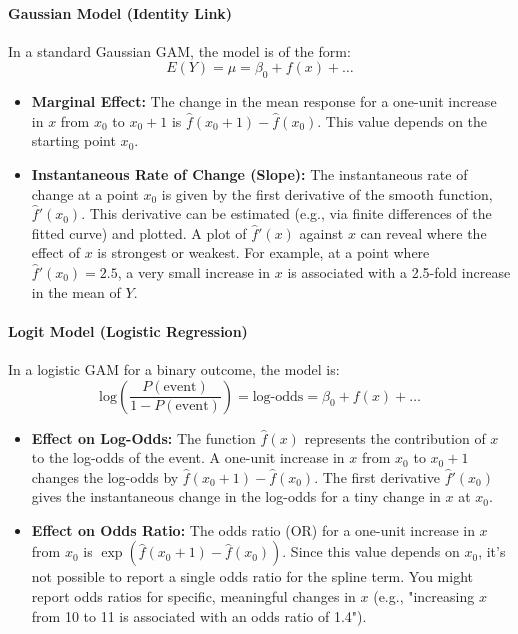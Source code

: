 \documentclass[11pt, a4paper]{article}
\begin{document}
\begin{itemize}
\paragraph{Gaussian Model (Identity Link)}
In a standard Gaussian GAM, the model is of the form:
\[ E(Y) = \mu = \beta_0 + f(x) + \dots \]
\begin{itemize}
 \item \textbf{Marginal Effect:} The change in the mean response for a one-unit increase in $x$ from $x_0$ to $x_0+1$ is $\hat{f}(x_0+1) - \hat{f}(x_0)$. This value depends on the starting point $x_0$.
 \item \textbf{Instantaneous Rate of Change (Slope):} The instantaneous rate of change at a point $x_0$ is given by the first derivative of the smooth function, $\hat{f}'(x_0)$. This derivative can be estimated (e.g., via finite differences of the fitted curve) and plotted. A plot of $\hat{f}'(x)$ against $x$ can reveal where the effect of $x$ is strongest or weakest. For example, at a point where $\hat{f}'(x_0) = 2.5$, a very small increase in $x$ is associated with a 2.5-fold increase in the mean of $Y$.
\end{itemize}

\paragraph{Logit Model (Logistic Regression)}
In a logistic GAM for a binary outcome, the model is:
\[ \text{log}\left(\frac{P(\text{event})}{1-P(\text{event})}\right) = \text{log-odds} = \beta_0 + f(x) + \dots \]
\begin{itemize}
 \item \textbf{Effect on Log-Odds:} The function $\hat{f}(x)$ represents the contribution of $x$ to the log-odds of the event. A one-unit increase in $x$ from $x_0$ to $x_0+1$ changes the log-odds by $\hat{f}(x_0+1) - \hat{f}(x_0)$. The first derivative $\hat{f}'(x_0)$ gives the instantaneous change in the log-odds for a tiny change in $x$ at $x_0$.
 \item \textbf{Effect on Odds Ratio:} The odds ratio (OR) for a one-unit increase in $x$ from $x_0$ is $\exp(\hat{f}(x_0+1) - \hat{f}(x_0))$. Since this value depends on $x_0$, it's not possible to report a single odds ratio for the spline term. You might report odds ratios for specific, meaningful changes in $x$ (e.g., "increasing $x$ from 10 to 11 is associated with an odds ratio of 1.4").
\end{itemize}


\end{itemize}
\end{document}
